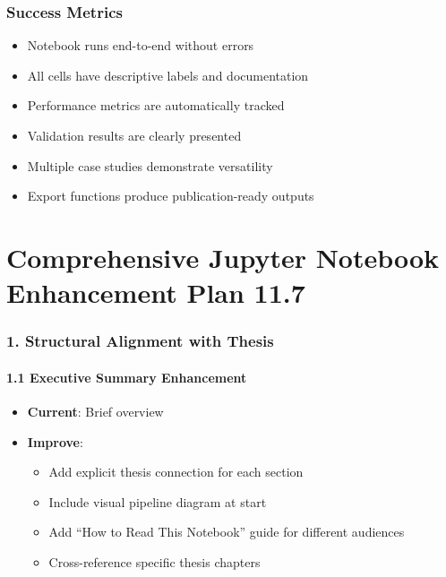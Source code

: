 \documentclass[
  11pt,
  letterpaper,
]{book}
\providecommand{\tightlist}{%
  \setlength{\itemsep}{0pt}\setlength{\parskip}{0pt}}
\begin{document}
\subsection{Success Metrics}\label{success-metrics}

\begin{itemize}
\tightlist
\item
  Notebook runs end-to-end without errors
\item
  All cells have descriptive labels and documentation\\
\item
  Performance metrics are automatically tracked
\item
  Validation results are clearly presented
\item
  Multiple case studies demonstrate versatility
\item
  Export functions produce publication-ready outputs
\end{itemize}


\chapter{Comprehensive Jupyter Notebook Enhancement Plan
11.7}\label{comprehensive-jupyter-notebook-enhancement-plan-11.7}

\subsection{1. Structural Alignment with
Thesis}\label{structural-alignment-with-thesis}

\subsubsection{1.1 Executive Summary
Enhancement}\label{executive-summary-enhancement}

\begin{itemize}
\tightlist
\item
  \textbf{Current}: Brief overview
\item
  \textbf{Improve}:

  \begin{itemize}
  \tightlist
  \item
    Add explicit thesis connection for each section
  \item
    Include visual pipeline diagram at start
  \item
    Add ``How to Read This Notebook'' guide for different audiences
  \item
    Cross-reference specific thesis chapters
  \end{itemize}
\end{itemize}
\end{document}
